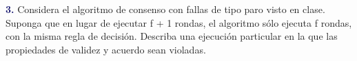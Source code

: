 \newpage
\textbf{\textcolor{MidnightBlue}{3.}} Considera el algoritmo de consenso con fallas de tipo
paro visto en clase. Suponga que en lugar de ejecutar f + 1 rondas, el algoritmo sólo ejecuta
f rondas, con la misma regla de decisión. Describa una ejecución particular en la que las propiedades
de validez y acuerdo sean violadas.
